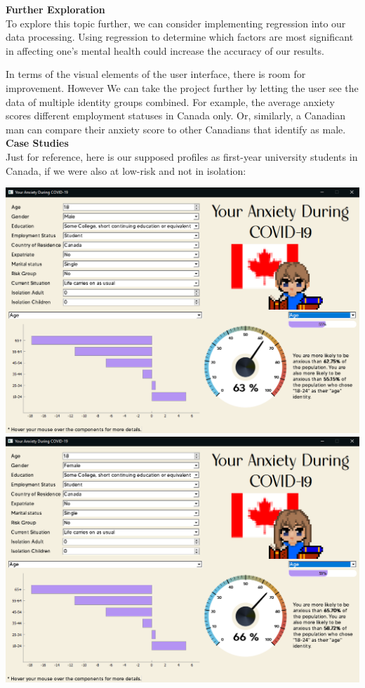 \documentclass[fontsize=11pt]{article}
\begin{document}
    \textbf{Further Exploration} \\
    To explore this topic further, we can consider implementing regression into our data processing. Using regression to determine which factors are most significant in affecting one’s mental health could increase the accuracy of our results.

    In terms of the visual elements of the user interface, there is room for improvement. However
    We can take the project further by letting the user see the data of multiple identity groups combined. For example, the average anxiety scores different employment statuses in Canada only. Or, similarly, a Canadian man can compare their anxiety score to other Canadians that identify as male. \\

    \textbf{Case Studies} \\
    Just for reference, here is our supposed profiles as first-year university students in Canada, if we were also at low-risk and not in isolation:

    \begin{center}
        \includegraphics[scale=0.30]{img/male_student_screenshot}
        \includegraphics[scale=0.30]{img/female_student_screenshot}
    \end{center}
\end{document}
